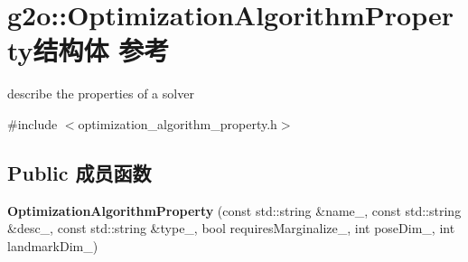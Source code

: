\hypertarget{structg2o_1_1OptimizationAlgorithmProperty}{\section{g2o\-:\-:Optimization\-Algorithm\-Property结构体 参考}
\label{structg2o_1_1OptimizationAlgorithmProperty}
}


describe the properties of a solver  




{\ttfamily \#include $<$optimization\-\_\-algorithm\-\_\-property.\-h$>$}

\subsection*{Public 成员函数}
\begin{DoxyCompactItemize}
\item 
\hypertarget{structg2o_1_1OptimizationAlgorithmProperty_a5633cbd029eda42670f801de508f945b}{{\bfseries Optimization\-Algorithm\-Property} (const std\-::string \&name\-\_\-, const std\-::string \&desc\-\_\-, const std\-::string \&type\-\_\-, bool requires\-Marginalize\-\_\-, int pose\-Dim\-\_\-, int landmark\-Dim\-\_\-)}\label{structg2o_1_1OptimizationAlgorithmProperty_a5633cbd029eda42670f801de508f945b}

\end{DoxyCompactItemize}
